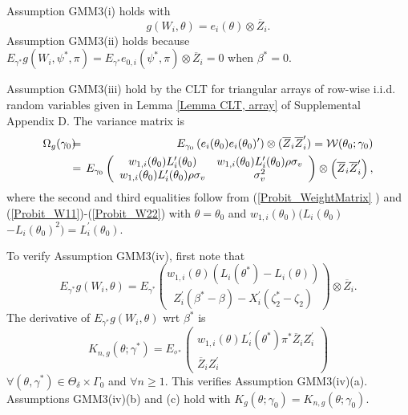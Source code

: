 \documentclass[12pt,titlepage,final,oneside,letterpaper]{article}
\begin{document}
\hspace{0.25in}Assumption GMM3(i) holds with 
\begin{equation}
g(W_{i},\theta )=e_{i}(\theta )\otimes \overline{Z}_{i}.
\end{equation}%
Assumption GMM3(ii) holds because $E_{\gamma ^{\ast }}g(W_{i},\psi ^{\ast
},\pi )=E_{\gamma ^{\ast }}e_{0,i}(\psi ^{\ast },\pi )\otimes \overline{Z}%
_{i}=0$ when $\beta ^{\ast }=0.$

Assumption GMM3(iii) hold by the CLT for triangular arrays of row-wise
i.i.d. random variables given in Lemma \ref{Lemma CLT, array} of
Supplemental Appendix D. The variance matrix is%
\begin{eqnarray}
\Omega _{g}(\gamma _{0})\hspace{-0.08in} &=&\hspace{-0.08in}E_{\gamma
_{0}}\left( e_{i}(\theta _{0})e_{i}(\theta _{0})^{\prime }\right) \otimes (%
\overline{Z}_{i}\overline{Z}_{i}^{\prime })=\mathcal{W}(\theta _{0};\gamma
_{0})  \notag \\
&=&\hspace{-0.08in}E_{\gamma _{0}}\left( 
\begin{array}{cc}
w_{1,i}(\theta _{0})L_{i}^{\prime }(\theta _{0}) & w_{1,i}(\theta
_{0})L_{i}^{\prime }(\theta _{0})\rho \sigma _{v} \\ 
w_{1,i}(\theta _{0})L_{i}^{\prime }(\theta _{0})\rho \sigma _{v} & \sigma
_{v}^{2}%
\end{array}%
\right) \otimes \left( \overline{Z}_{i}\overline{Z}_{i}^{\prime }\right) ,
\label{Probit_Omega}
\end{eqnarray}%
where the second and third equalities follow from (\ref{Probit_WeightMatrix}%
) and (\ref{Probit_W11})-(\ref{Probit_W22}) with $\theta =\theta _{0}$ and $%
w_{1,i}(\theta _{0})(L_{i}(\theta _{0})$\allowbreak $-L_{i}(\theta
_{0})^{2})\allowbreak =L_{i}^{\prime }(\theta _{0}).$

To verify Assumption GMM3(iv), first note that%
\begin{equation}
E_{\gamma ^{\ast }}g(W_{i},\theta )=E_{\gamma ^{\ast }}\binom{w_{1,i}(\theta
)(L_{i}(\theta ^{\ast })-L_{i}(\theta ))}{Z_{i}^{\prime }(\beta ^{\ast
}-\beta )-X_{i}^{\prime }(\zeta _{2}^{\ast }-\zeta _{2})}\otimes \overline{Z}%
_{i}.  \label{Expected g}
\end{equation}%
The derivative of $E_{\gamma ^{\ast }}g(W_{i},\theta )$ wrt $\beta ^{\ast }$
is%
\begin{equation}
K_{n,g}(\theta ;\gamma ^{\ast })=E_{^{\phi \ast }}\left( 
\begin{array}{c}
w_{1,i}(\theta )L_{i}^{\prime }(\theta ^{\ast })\pi ^{\ast }\overline{Z}%
_{i}Z_{i}^{\prime } \\ 
\overline{Z}_{i}Z_{i}^{\prime }%
\end{array}%
\right)  \label{Probit Kg}
\end{equation}%
$\forall (\theta ,\gamma ^{\ast })\in \Theta _{\delta }\times \Gamma _{0}$
and $\forall n\geq 1.$ This verifies Assumption GMM3(iv)(a). Assumptions
GMM3(iv)(b) and (c) hold with $K_{g}(\theta ;\gamma _{0})=K_{n,g}(\theta
;\gamma _{0}).$
\end{document}
